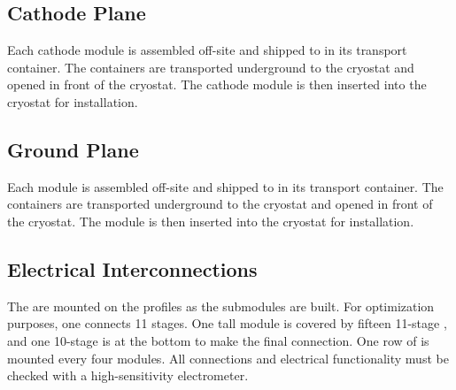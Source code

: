 \subsection{Cathode Plane}
\label{sec:fddp-hv-prod-assy-cathode}



Each cathode module is assembled off-site and shipped to \surf in its transport container.   The containers are transported underground to the cryostat and opened in front of the cryostat.  The cathode module is then inserted into the cryostat for installation. 

 

\subsection{Ground Plane} %
\label{sec:fddp-prod-assy-ground-grid}


Each  module is assembled off-site and shipped to \surf in its transport container.   The containers are transported underground to the cryostat and opened in front of the cryostat.  The  module is then inserted into the cryostat for installation. 

\subsection{Electrical Interconnections}
\label{sec:fddp-prod-assy-elec-connec}

The  are mounted on the profiles as the submodules are built.  For optimization purposes, one   connects \num{11}  stages.   %
One \tpcheight tall module is covered by fifteen \num{11}-stage , and one \num{10}-stage  is at the bottom to make the final connection.   One row of  is mounted every four  modules.  All connections and electrical functionality must be checked with a high-sensitivity electrometer.

